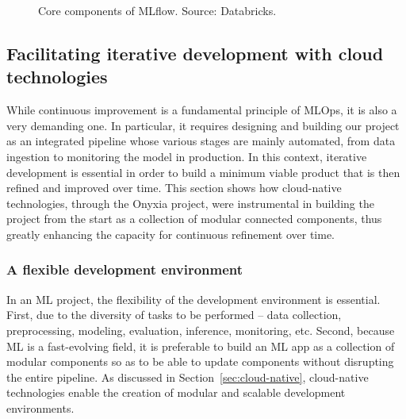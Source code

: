 \documentclass[graybox]{svmult}
\begin{document}
\begin{figure}[htbp]
    \centering
    \caption{Core components of MLflow. Source: Databricks.}
    \label{fig:mlflow-components}
\end{figure}






\subsection{Facilitating iterative development with cloud technologies}

While continuous improvement is a fundamental principle of MLOps, it is also a very demanding one. In particular, it requires designing and building our project as an integrated pipeline whose various stages are mainly automated, from data ingestion to monitoring the model in production. In this context, iterative development is essential in order to build a minimum viable product that is then refined and improved over time. This section shows how cloud-native technologies, through the Onyxia project, were instrumental in building the project from the start as a collection of modular connected components, thus greatly enhancing the capacity for continuous refinement over time.

\subsubsection{A flexible development environment}

In an ML project, the flexibility of the development environment is essential. First, due to the diversity of tasks to be performed -- data collection, preprocessing, modeling, evaluation, inference, monitoring, etc. Second, because ML is a fast-evolving field, it is preferable to build an ML app as a collection of modular components so as to be able to update components without disrupting the entire pipeline. As discussed in Section~\ref{sec:cloud-native}, cloud-native technologies enable the creation of modular and scalable development environments.
\end{document}
